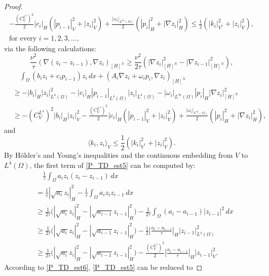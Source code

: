 \documentclass{sinst}
\numberwithin{equation}{section}
\theoremstyle{plain}
\theoremstyle{definition}
\def\dual#1{\langle #1 \rangle}
\begin{document}
\begin{proof}
\begin{gather}
    - \frac{(C_V^{L^4})^2}{2}|c_i|_H(|p_{i-1}|_V^2 + |z_i|_V^2) + \frac{|\omega_i|_{L^\infty(\Omega)}}{2}(|p_i|_H^2 + |\nabla z_i|_H^2) \leq \frac{1}{2}(|k_i|_{V^*}^2 + |z_i|_V^2),
    \\
    \mbox{for every } i = 1,2,3,\dots,
  \end{gather}
  via the following calculations:
  \begin{equation}
    \frac{\nu^2}{\tau}(\nabla(z_i - z_{i-1}), \nabla z_i)_{[H]^N} \geq \frac{\nu^2}{2\tau}(|\nabla z_i|_{[H]^N}^2 - |\nabla z_{i-1}|_{[H]^N}^2),
  \end{equation}
  \begin{align}
    &\quad \int_\Omega (b_i z_i + c_i p_{i-1}) z_i \,dx + (A_i \nabla z_i + \omega_i p_i, \nabla z_i)_{[H]^N}
    \\
    &\geq - |b_i|_H |z_i|_{L^4(\Omega)}^2 - |c_i|_H |p_{i-1}|_{L^4(\Omega)} |z_i|_{L^4(\Omega)} - |\omega_i|_{L^\infty(\Omega)} |p_i|_H |\nabla z_i|_{[H]^N}^2
    \\
    &\geq - (C_V^{L^4})^2 |b_i|_H |z_i|_V^2 - \frac{(C_V^{L^4})^2}{2}|c_i|_H(|p_{i-1}|_V^2 + |z_i|_V^2) + \frac{|\omega_i|_{L^\infty(\Omega)}}{2}(|p_i|_H^2 + |\nabla z_i|_H^2),
  \end{align}
  and
  \begin{equation}
    \dual{k_i, z_i}_V \leq \frac{1}{2}(|k_i|_{V^*}^2 + |z_i|_V^2).
  \end{equation}
  By H\"older's and Young's inequalities and the continuous embedding from $V$ to $L^4(\Omega)$, the first term of \eqref{P_TD_est5} can be computed by:
  \begin{align}
    &\quad\frac{1}{\tau} \int_\Omega a_i z_i(z_i - z_{i-1}) \,dx
    \\
    &= \frac{1}{\tau}|\sqrt{a_i} z_i|_H^2 - \frac{1}{\tau} \int_\Omega a_i z_i z_{i-1} \,dx
    \\
    &\geq \frac{1}{2\tau} \bigl( |\sqrt{a_i} z_i|_H^2 - |\sqrt{a_{i-1}} z_{i-1}|_H^2 \bigr) - \frac{1}{2\tau} \int_\Omega (a_i - a_{i-1}) |z_{i-1}|^2 \,dx \label{P_TD_est6}
    \\
    &\geq \frac{1}{2\tau} \bigl( |\sqrt{a_i} z_i|_H^2 - |\sqrt{a_{i-1}} z_{i-1}|_H^2 \bigr) - \frac{1}{2} \left| \frac{a_i - a_{i-1}}{\tau} \right|_H |z_{i-1}|_{L^4(\Omega)}^2
    \\
    &\geq \frac{1}{2\tau} \bigl( |\sqrt{a_i} z_i|_H^2 - |\sqrt{a_{i-1}} z_{i-1}|_H^2 \bigr) - \frac{(C_V^{L^4})^2}{2} \left| \frac{a_i - a_{i-1}}{\tau} \right|_H |z_{i-1}|_V^2.
  \end{align}
  According to \eqref{P_TD_est6}, \eqref{P_TD_est5} can be reduced to

\end{proof}
\end{document}
